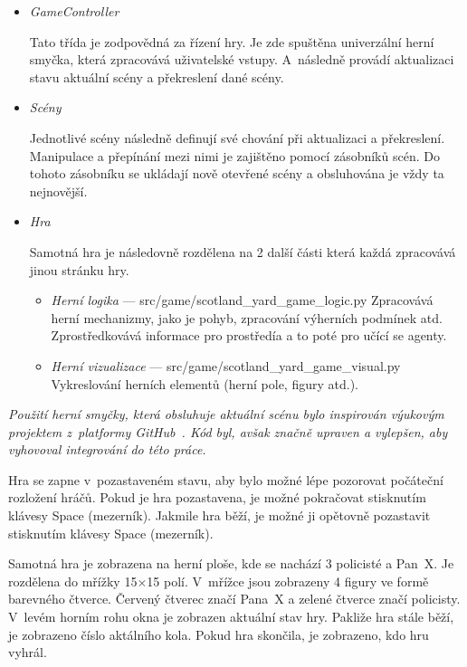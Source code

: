 \begin{itemize}
  \item \emph{GameController}~\cite{GameSceneController}
  
  Tato třída je zodpovědná za řízení hry.
  Je zde spuštěna univerzální herní smyčka, která zpracovává uživatelské vstupy.
  A~následně provádí aktualizaci stavu aktuální scény a překreslení dané scény.
  \item \emph{Scény}~\cite{GameSceneController}
  
  Jednotlivé scény následně definují své chování při aktualizaci a překreslení.
  Manipulace a přepínání mezi nimi je zajištěno pomocí zásobníků scén.
  Do tohoto zásobníku se ukládají nově otevřené scény a obsluhována je vždy ta nejnovější.

  \item \emph{Hra}

    Samotná hra je následovně rozdělena na 2 další části která každá zpracovává jinou stránku hry.\vspace{-0.5em}
    \begin{itemize}
      \item \emph{Herní logika} --- src/game/scotland\_yard\_game\_logic.py
      Zpracovává herní mechanizmy, jako je pohyb, zpracování výherních podmínek atd.
      Zprostředkovává informace pro prostředía a to poté pro učící se agenty.

      \item \emph{Herní vizualizace} ---  src/game/scotland\_yard\_game\_visual.py
      Vykreslování herních elementů (herní pole, figury atd.).
    \end{itemize}
\end{itemize}

\textit{Použití herní smyčky, která obsluhuje aktuální scénu bylo inspirován výukovým projektem z~platformy GitHub~\cite{GameSceneController}.
Kód byl, avšak značně upraven a vylepšen, aby vyhovoval integrování do této práce.}

Hra se zapne v~pozastaveném stavu, aby bylo možné lépe pozorovat počáteční rozložení hráčů.
Pokud je hra pozastavena, je možné pokračovat stisknutím klávesy Space (mezerník).
Jakmile hra běží, je možné ji opětovně pozastavit stisknutím klávesy Space (mezerník).

Samotná hra je zobrazena na herní ploše, kde se nachází 3 policisté a Pan~X\@.
Je rozdělena do mřížky 15$\times$15 polí.
V~mřížce jsou zobrazeny 4 figury ve formě barevného čtverce.
Červený čtverec značí Pana~X a zelené čtverce značí policisty.
V~levém horním rohu okna je zobrazen aktuální stav hry.
Pakliže hra stále běží, je zobrazeno číslo aktálního kola.
Pokud hra skončila, je zobrazeno, kdo hru vyhrál.

